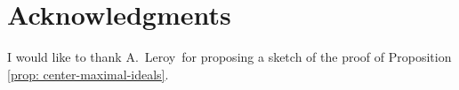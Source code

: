 \documentclass[11pt,a4paper]{article}
\theoremstyle{theorem}
\numberwithin{equation}{section}
\begin{document}

\section*{Acknowledgments}
I would like to thank A.~Leroy~for proposing a sketch of the proof of Proposition \ref{prop: center-maximal-ideals}.





 
\end{document}
